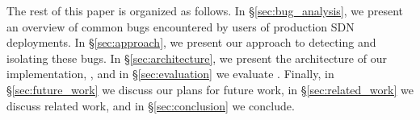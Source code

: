 The rest of this paper is organized as follows. In \S\ref{sec:bug_analysis}, we present an overview of common bugs
encountered by users of production SDN deployments. In \S\ref{sec:approach}, we present our approach to
detecting and isolating these bugs. In \S\ref{sec:architecture}, we present the
architecture of our implementation, \projectname{}, and in
\S\ref{sec:evaluation} we evaluate \projectname{}. Finally, in \S\ref{sec:future_work} we discuss our plans
for future work, in \S\ref{sec:related_work} we discuss related work, and in \S\ref{sec:conclusion} we conclude.
